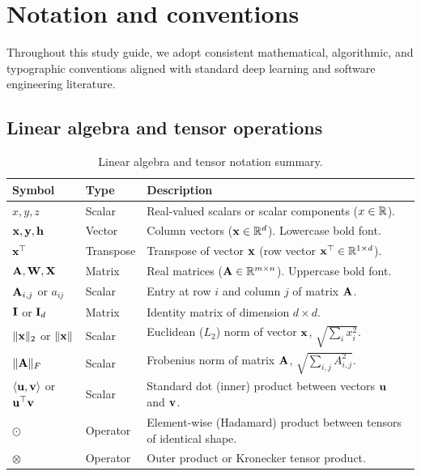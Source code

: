 \documentclass[../main.tex]{subfiles}
\begin{document}
\chapter*{Notation and conventions}

Throughout this study guide, we adopt consistent mathematical, algorithmic, and typographic conventions aligned with standard deep learning and software engineering literature.

\section*{Linear algebra and tensor operations}
\begin{table}[htbp]
\centering
\small
\renewcommand{\arraystretch}{1.3}
\begin{tabularx}{\textwidth}{llX}
\toprule
\textbf{Symbol} & \textbf{Type} & \textbf{Description} \\
\midrule
$x, y, z$ & Scalar & Real-valued scalars or scalar components ($x \in \mathbb{R}$). \\
$\mathbf{x}, \mathbf{y}, \mathbf{h}$ & Vector & Column vectors ($\mathbf{x} \in \mathbb{R}^d$). Lowercase bold font. \\
$\mathbf{x}^\top$ & Transpose & Transpose of vector $\mathbf{x}$ (row vector $\mathbf{x}^\top \in \mathbb{R}^{1 \times d}$). \\
$\mathbf{A}, \mathbf{W}, \mathbf{X}$ & Matrix & Real matrices ($\mathbf{A} \in \mathbb{R}^{m \times n}$). Uppercase bold font. \\
$\mathbf{A}_{i,j}$ or $a_{ij}$ & Scalar & Entry at row $i$ and column $j$ of matrix $\mathbf{A}$. \\
$\mathbf{I}$ or $\mathbf{I}_d$ & Matrix & Identity matrix of dimension $d \times d$. \\
$\lVert\mathbf{x}\rVert_2$ or $\lVert\mathbf{x}\rVert$ & Scalar & Euclidean ($L_2$) norm of vector $\mathbf{x}$, $\sqrt{\sum_i x_i^2}$. \\
$\lVert\mathbf{A}\rVert_F$ & Scalar & Frobenius norm of matrix $\mathbf{A}$, $\sqrt{\sum_{i,j} A_{i,j}^2}$. \\
$\langle\mathbf{u}, \mathbf{v}\rangle$ or $\mathbf{u}^\top \mathbf{v}$ & Scalar & Standard dot (inner) product between vectors $\mathbf{u}$ and $\mathbf{v}$. \\
$\odot$ & Operator & Element-wise (Hadamard) product between tensors of identical shape. \\
$\otimes$ & Operator & Outer product or Kronecker tensor product. \\
\bottomrule
\end{tabularx}
\caption{Linear algebra and tensor notation summary.}
\label{tab:notation_linalg}
\end{table}
\end{document}

